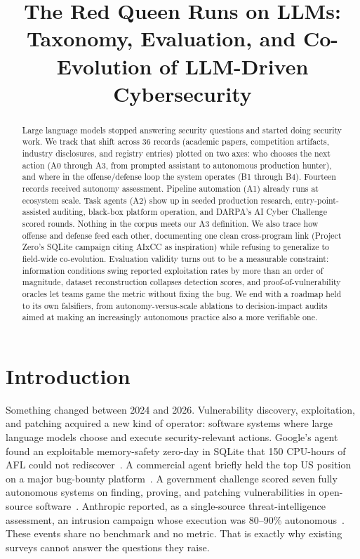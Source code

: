 \documentclass[conference,compsoc]{IEEEtran}
\begin{document}
\title{The Red Queen Runs on LLMs: Taxonomy, Evaluation, and Co-Evolution of LLM-Driven Cybersecurity}

\author{}

\maketitle

\begin{abstract}
Large language models stopped answering security questions and started doing security work.
We track that shift across 36 records (academic papers, competition artifacts, industry
disclosures, and registry entries) plotted on two axes: who chooses the next action
(A0 through A3, from prompted assistant to autonomous production hunter), and where
in the offense/defense loop the system operates (B1 through B4). Fourteen records
received autonomy assessment. Pipeline automation (A1) already runs at ecosystem scale.
Task agents (A2) show up in seeded production research, entry-point-assisted auditing,
black-box platform operation, and DARPA's AI Cyber Challenge scored rounds. Nothing
in the corpus meets our A3 definition. We also trace how offense and defense feed
each other, documenting one clean cross-program link (Project Zero's SQLite campaign
citing AIxCC as inspiration) while refusing to generalize to field-wide co-evolution.
Evaluation validity turns out to be a measurable constraint: information conditions swing
reported exploitation rates by more than an order of magnitude, dataset reconstruction
collapses detection scores, and proof-of-vulnerability oracles let teams game the metric
without fixing the bug. We end with a roadmap held to its own falsifiers, from
autonomy-versus-scale ablations to decision-impact audits aimed at making an
increasingly autonomous practice also a more verifiable one.
\end{abstract}

\vspace{6pt}
\section{Introduction}
\label{sec:intro}
Something changed between 2024 and 2026. Vulnerability discovery, exploitation, and patching
acquired a new kind of operator: software systems where large language models choose and
execute security-relevant actions. Google's agent found an exploitable memory-safety zero-day
in SQLite that 150 CPU-hours of AFL could not rediscover~\cite{bigsleep2024}. A commercial
agent briefly held the top US position on a major bug-bounty platform~\cite{xbowtop12025}.
A government challenge scored seven fully autonomous systems on finding, proving, and
patching vulnerabilities in open-source software~\cite{darparesults2025,r7sokaixcc2026}.
Anthropic reported, as a single-source threat-intelligence assessment, an intrusion
campaign whose execution was 80--90\% autonomous~\cite{anthropicgtg2025}. These events
share no benchmark and no metric. That is exactly why existing surveys cannot answer the
questions they raise.
\end{document}
